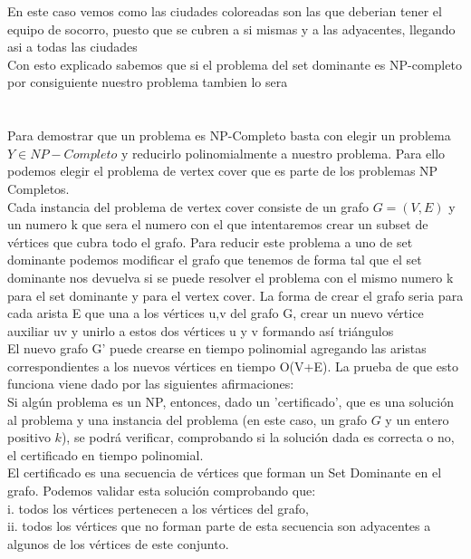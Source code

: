 En este caso vemos como las ciudades coloreadas son las que deberian tener el equipo de socorro, puesto que se cubren a si mismas y a las adyacentes, llegando asi a todas las ciudades\\ 
Con esto explicado sabemos que si el problema del set dominante es NP-completo por consiguiente nuestro problema tambien lo sera

\section{}


    Para demostrar que un problema es NP-Completo basta con elegir un problema $Y \in NP-Completo$ y reducirlo polinomialmente a nuestro problema. Para ello podemos elegir el problema de vertex cover que es parte de los problemas NP Completos.\\
    
    Cada instancia del problema de vertex cover consiste de un grafo $G = (V,E)$ y un numero k que sera el numero con el que intentaremos crear un subset de vértices que cubra todo el grafo. Para reducir este problema a uno de set dominante podemos modificar el grafo que tenemos de forma tal que el set dominante nos devuelva si se puede resolver el problema con el mismo numero k para el set dominante y para el vertex cover. La forma de crear el grafo seria para cada arista E que una a los vértices {u,v} del grafo G, crear un nuevo vértice auxiliar {uv} y unirlo a estos dos vértices {u} y {v} formando así triángulos \\

    El nuevo grafo G' puede crearse en tiempo polinomial agregando las aristas correspondientes a los nuevos vértices en tiempo O(V+E).
    La prueba de que esto funciona viene dado por las siguientes afirmaciones: \\
    
    Si algún problema es un NP, entonces, dado un 'certificado', que es una solución al problema y una instancia del problema (en este caso, un grafo $G$ y un entero positivo $k$), se podrá verificar, comprobando si la solución dada es correcta o no, el certificado en tiempo polinomial.\\

El certificado es una secuencia de vértices que forman un Set Dominante en el grafo. Podemos validar esta solución comprobando que:\\
i. todos los vértices pertenecen a los vértices del grafo,\\
ii. todos los vértices que no forman parte de esta secuencia son adyacentes a algunos de los vértices de este conjunto.\\

